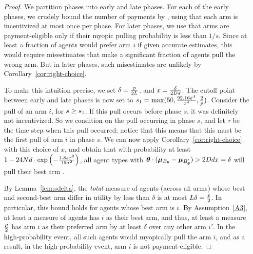 \begin{proof}
We partition phases into early and late phases.
For each of the early phases,
we crudely bound the number of payments by \ARMNUM,
using that each arm is incentivized at most once per phase.
For later phases,
we use that arms are payment-eligible only if their myopic pulling
probability is less than $1/s$.
Since at least a \MinProb fraction of agents would prefer arm $i$ if
given accurate estimates, this would require misestimates that make a
significant fraction of agents pull the wrong arm.
But in later phases, such misestimates are unlikely by
Corollary~\ref{cor:right-choice}.

To make this intuition precise, we set
$\delta = \frac{p}{2 L}$,
and $x = \frac{\delta}{2 D d}$.
The cutoff point between early and late phases is now set to
$s_1 = \max(50, \frac{92.16 \sigma^4}{x^4}, \frac{2}{p})$.
Consider the  pull of an arm $i$, for $s \geq s_1$.
If this pull occurs before phase $s$, it was definitely not incentivized.
So we condition on the pull occurring in phase $s$,
and let $\tau$ be the time step when this pull occurred; notice that
this means that this must be the first pull of arm $i$ in phase $s$.
We can now apply Corollary~\ref{cor:right-choice}
with this choice of $x$,
and obtain that with probability at least 
$1 - 24 N d \cdot \exp\left(-\frac{1.8 s x^2}{16 \sigma^2} \right)$,
all agent types \AgV with
$\bm{\theta} \cdot (\bm{\mu}_{B_{\bm{\theta}}} - \bm{\mu}_{B'_{\bm{\theta}}})
> 2D d x = \delta$
will pull their best arm \Best{\AgV}.

By Lemma~\ref{lem:sdelta}, the \emph{total} measure of agents (across
all arms) whose best and second-best arm differ in utility by less
than $\delta$ is at most $L \delta = \frac{p}{2}$.
In particular, this bound holds for agents whose best arm is $i$.
By Assumption~\ref{A3}, at least a measure \MinProb of agents has $i$
as their best arm, and thus, at least a measure $\frac{p}{2}$
has arm $i$ as their preferred arm by at least $\delta$ over any other
arm $i'$.
In the high-probability event, all such agents would myopically pull
the arm $i$, and as a result, in the high-probability event,
arm $i$ is not payment-eligible.


\end{proof}

